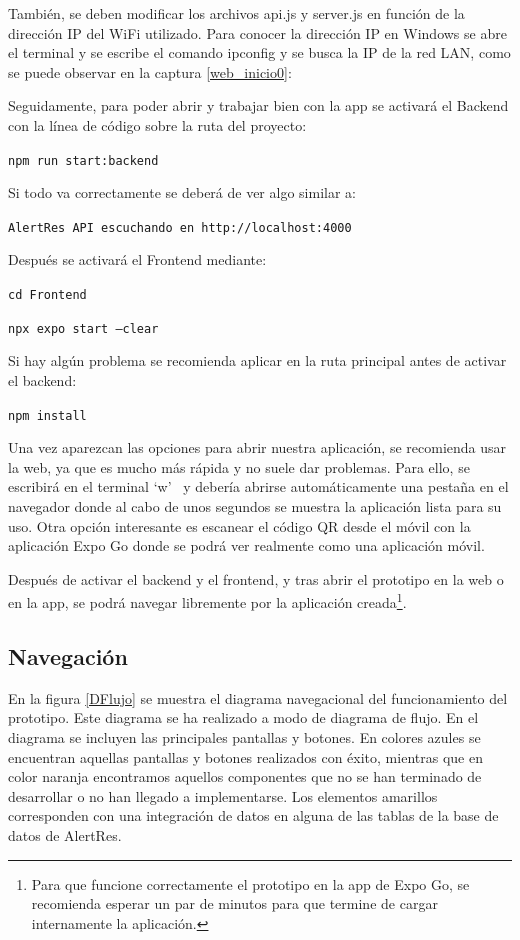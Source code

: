 También, se deben modificar los archivos api.js y server.js en función de la dirección IP del WiFi utilizado. Para conocer la dirección IP en Windows se abre el terminal y se escribe el comando ipconfig y se busca la IP de la red LAN, como se puede observar en la captura \ref{web_inicio0}:


Seguidamente, para poder abrir y trabajar bien con la app se activará el Backend con la línea de código sobre la ruta del proyecto:
\begin{center}
\texttt{npm run start:backend}
\end{center}
Si todo va correctamente se deberá de ver algo similar a:
\begin{center}
\texttt{AlertRes API escuchando en http://localhost:4000}
\end{center}
Después se activará el Frontend mediante:
\begin{center}
\texttt{cd Frontend}

\texttt{npx expo start --clear}
\end{center}
Si hay algún problema se recomienda aplicar en la ruta principal antes de activar el backend:
\begin{center}
\texttt{npm install}
\end{center}


Una vez aparezcan las opciones para abrir nuestra aplicación, se recomienda usar la web, ya que es mucho más rápida y no suele dar problemas. Para ello, se escribirá en el terminal `w'~ y debería abrirse automáticamente una pestaña en el navegador donde al cabo de unos segundos se muestra la aplicación lista para su uso. Otra opción interesante es escanear el código QR desde el móvil con la aplicación Expo Go donde se podrá ver realmente como una aplicación móvil.

Después de activar el backend y el frontend, y tras abrir el prototipo en la web o en la app, se podrá navegar libremente por la aplicación creada\footnote{Para que funcione correctamente el prototipo en la app de Expo Go, se recomienda esperar un par de minutos para que termine de cargar internamente la aplicación.}.


    \subsection{Navegación}    
    En la figura \ref{DFlujo} se muestra el diagrama navegacional del funcionamiento del prototipo. Este diagrama se ha realizado a modo de diagrama de flujo. En el diagrama se incluyen las principales pantallas y botones. En colores azules se encuentran aquellas pantallas y botones realizados con éxito, mientras que en color naranja encontramos aquellos componentes que no se han terminado de desarrollar o no han llegado a implementarse. Los elementos amarillos corresponden con una integración de datos en alguna de las tablas de la base de datos de AlertRes.
    
